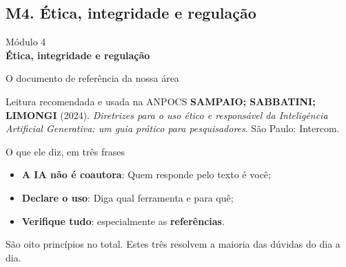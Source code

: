 \documentclass[11pt,aspectratio=169,t]{beamer}
\newcommand{\transicao}[2]{%
  \begin{frame}[plain]
    \centering
    \vspace*{2.2cm}
    {\large\color{cinzaescuro} #1}\\[0.8cm]
    {\Large\color{azulUNI}\textbf{#2}}
  \end{frame}}
\begin{document}
\subsection{M4. Ética, integridade e regulação}
\transicao{Módulo 4}{Ética, integridade e regulação}
\begin{frame}{O documento de referência da nossa área}
  \begin{exampleblock}{Leitura recomendada e usada na ANPOCS}
    \textbf{SAMPAIO; SABBATINI; LIMONGI} (2024). \textit{Diretrizes para o uso ético e responsável da Inteligência Artificial Generativa: um guia prático para pesquisadores}. São Paulo: Intercom.
  \end{exampleblock}
  \pause
  \begin{block}{O que ele diz, em três frases}
    \begin{itemize}
      \item \textbf{A IA não é coautora}: Quem responde pelo texto é você;
      \item \textbf{Declare o uso}: Diga qual ferramenta e para quê;
      \item \textbf{Verifique tudo}: especialmente as \textbf{referências}.
    \end{itemize}
  \end{block}
  \pause
  \centering\small São oito princípios no total. Estes três resolvem a maioria das dúvidas do dia a dia.
\end{frame}
\end{document}
